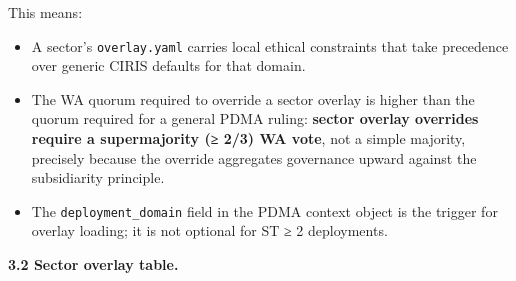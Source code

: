 \documentclass[11pt]{article}
\begin{document}
This means:


\begin{itemize}\setlength\itemsep{0pt}
\item A sector's \texttt{overlay.yaml} carries local ethical constraints that take precedence over generic CIRIS defaults for that domain.
\item The WA quorum required to override a sector overlay is higher than the quorum required for a general PDMA ruling: \textbf{sector overlay overrides require a supermajority (≥ 2/3) WA vote}, not a simple majority, precisely because the override aggregates governance upward against the subsidiarity principle.
\item The \texttt{deployment\_domain} field in the PDMA context object is the trigger for overlay loading; it is not optional for ST ≥ 2 deployments.
\end{itemize}


\textbf{3.2 Sector overlay table.}
\end{document}
